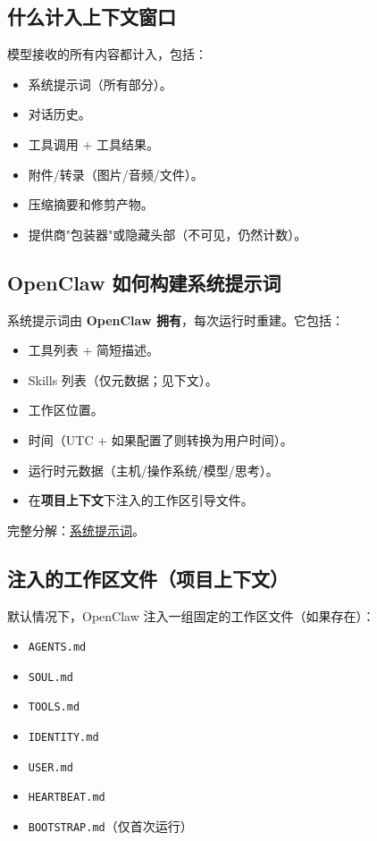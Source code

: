 \subsection{什么计入上下文窗口}


模型接收的所有内容都计入，包括：

\begin{itemize}
  \item 系统提示词（所有部分）。
  \item 对话历史。
  \item 工具调用 + 工具结果。
  \item 附件/转录（图片/音频/文件）。
  \item 压缩摘要和修剪产物。
  \item 提供商"包装器"或隐藏头部（不可见，仍然计数）。
\end{itemize}


\subsection{OpenClaw 如何构建系统提示词}


系统提示词由 \textbf{OpenClaw 拥有}，每次运行时重建。它包括：

\begin{itemize}
  \item 工具列表 + 简短描述。
  \item Skills 列表（仅元数据；见下文）。
  \item 工作区位置。
  \item 时间（UTC + 如果配置了则转换为用户时间）。
  \item 运行时元数据（主机/操作系统/模型/思考）。
  \item 在\textbf{项目上下文}下注入的工作区引导文件。
\end{itemize}


完整分解：\href{/concepts/system-prompt}{系统提示词}。

\subsection{注入的工作区文件（项目上下文）}


默认情况下，OpenClaw 注入一组固定的工作区文件（如果存在）：

\begin{itemize}
  \item \texttt{AGENTS.md}
  \item \texttt{SOUL.md}
  \item \texttt{TOOLS.md}
  \item \texttt{IDENTITY.md}
  \item \texttt{USER.md}
  \item \texttt{HEARTBEAT.md}
  \item \texttt{BOOTSTRAP.md}（仅首次运行）
\end{itemize}


